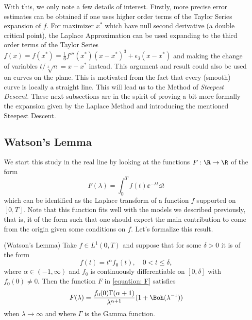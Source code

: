 	With this, we only note a few details of interest. Firstly, more precise error estimates can be obtained if one uses higher order terms of the Taylor Series expansion of $f$. For maximizer $x^*$ which have null second derivative (a double critical point), the Laplace Approximation can be used expanding to the third order terms of the Taylor Series $f(x) = f(x^*) = \frac{1}{6}f'''(x^*)(x-x^*)^3 + \epsilon_3(x-x^*)$ and making the change of variables $t/\sqrt[3]{n} = x - x^*$ instead. This argument and result could also be used on curves on the plane. This is motivated from the fact that every (smooth) curve is locally a straight line. This will lead us to the Method of \textit{Steepest Descent}. These next subsections are in the spirit of proving a bit more formally the expansion given by the Laplace Method and introducing the mentioned Steepest Descent.

\subsection{Watson's Lemma} 

We start this study in the real line by looking at the functions $F: \R \rightarrow \R$ of the form
\begin{equation}
	F(\lambda) = \int_{0}^{T} f(t) \ee^{-\lambda t} \dd t
	\label{equation: F}
\end{equation}
which can be identified as the Laplace transform of a function $f$ supported on $[0,T]$. Note that this function fits well with the models we described previously, that is, it of the form such that one should expect the main contribution to come from the origin given some conditions on $f$. Let's formalize this result.

\begin{teorema}	
	(Watson's Lemma) Take $f \in L^1(0,T)$ and suppose that for some $\delta > 0$ it is of the form
	\begin{equation}
		f(t) = t^\alpha f_0(t), \quad 0 < t \leq \delta,
	\end{equation}
	where $\alpha \in (-1, \infty)$ and $f_0$ is continuously differentiable on $[0, \delta]$ with $f_0(0) \neq 0$. Then the function $F$ in \ref{equation: F} satisfies
	\begin{equation}
		F(\lambda) = \frac{f_0(0) \Gamma(\alpha + 1)}{\lambda^{\alpha + 1}} (1 + \Boh(\lambda^{-1}))
	\end{equation}
	when $\lambda \rightarrow \infty$ and where $\Gamma$ is the Gamma function.
\end{teorema}

